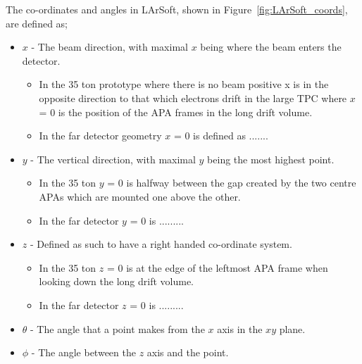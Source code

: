 The co-ordinates and angles in LArSoft, shown in Figure~\ref{fig:LArSoft_coords}, are defined as;
\begin{itemize}
\item $x$ - The beam direction, with maximal $x$ being where the beam enters the detector.
  \begin{itemize}
  \item In the 35 ton prototype where there is no beam positive x is in the opposite direction to that which electrons drift in the large TPC where $x$ = 0 is the position of the APA frames in the long drift volume.
  \item In the far detector geometry $x$ = 0 is defined as .......
  \end{itemize}
\item $y$ - The vertical direction, with maximal $y$ being the most highest point.
  \begin{itemize}
  \item In the 35 ton $y$ = 0 is halfway between the gap created by the two centre APAs which are mounted one above the other.
  \item In the far detector $y$ = 0 is .........
  \end {itemize}
\item $z$ - Defined as such to have a right handed co-ordinate system.
  \begin{itemize}
  \item In the 35 ton $z$ = 0 is at the edge of the leftmost APA frame when looking down the long drift volume.
  \item In the far detector $z$ = 0 is .........
  \end{itemize}
\item $\theta$ - The angle that a point makes from the $x$ axis in the $xy$ plane.
\item $\phi$ - The angle between the $z$ axis and the point.
\end{itemize}

